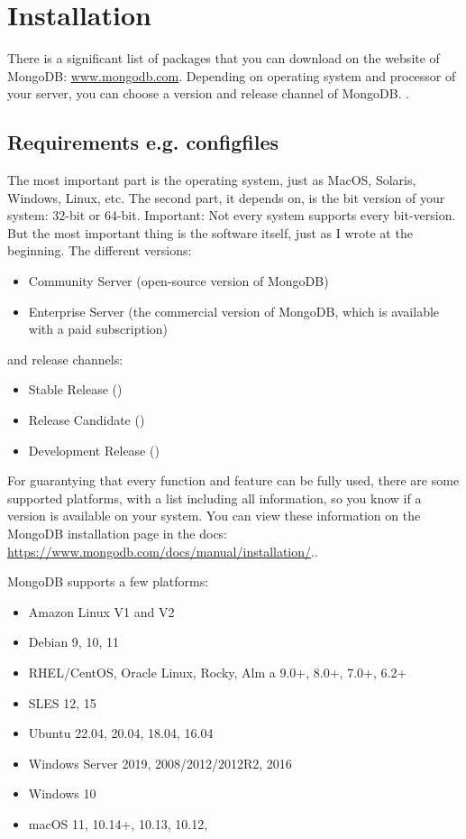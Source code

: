 
\section{Installation}
There is a significant list of packages that you can download on the website of MongoDB: \url{www.mongodb.com}. 
Depending on operating system and processor of your server, you can choose a version and release channel of MongoDB. \parencite{Membrey2014}.

\subsection{Requirements e.g. configfiles}
The most important part is the operating system, just as MacOS, Solaris, Windows, Linux, etc. 
The second part, it depends on, is the bit version of your  system: 32-bit or 64-bit.
Important: Not every system supports every bit-version.
But the most important thing is the software itself, just as I wrote at the beginning.
The different versions:
\begin{itemize}
    \item Community Server (open-source version of MongoDB)
    \item Enterprise Server (the commercial version of MongoDB, which is available with a paid subscription)
\end{itemize}
and release channels:
\begin{itemize}
    \item Stable Release ()
    \item Release Candidate ()
    \item Development Release ()
\end{itemize}

For guarantying that every function and feature can be fully used, there are some supported platforms, with a list including all information, so you know if a version is available on your system.
You can view these information on the MongoDB installation page in the docs: \url{https://www.mongodb.com/docs/manual/installation/}.\parencite{Membrey2014}.

MongoDB supports a few platforms: 
\begin{itemize}
    \item Amazon Linux V1 and V2
    \item Debian 9, 10, 11
    \item RHEL/CentOS, Oracle Linux, Rocky, Alm a 9.0+, 8.0+, 7.0+, 6.2+
    \item SLES 12, 15
    \item Ubuntu 22.04, 20.04, 18.04, 16.04
    \item Windows Server 2019, 2008/2012/2012R2, 2016
    \item Windows 10
    \item macOS 11, 10.14+, 10.13, 10.12, 
\end{itemize}\parencite{Mongo-Installation}

